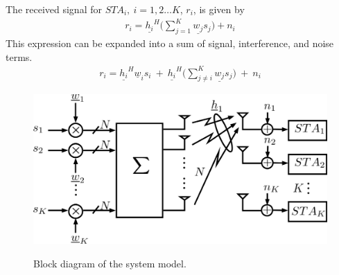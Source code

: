 The received signal for $STA_i,\ i=1,2\ldots K$, $r_i$, is given by
 \begin{equation}
     \begin{aligned}\label{eq:rx_sig}
        r_i = \underline{h_i}^H \big( \sum_{j=1}^K \underline{w_j}s_j \big) + n_i
     \end{aligned}
 \end{equation}
 This expression can be expanded into a sum of signal, interference, and noise terms.
  \begin{equation}
     \begin{aligned}\label{eq:rx_sig_expanded}
        r_i = \underline{h_i}^H \underline w_i s_i \ +\ \underline{h_i}^H\big( \sum_{j \neq i}^K \underline{w_j}s_j \big)\ +\ n_i
     \end{aligned}
 \end{equation}


\begin{figure}
    \includegraphics[width=14cm]{figs/system_desc.png}\\
    \caption{Block diagram of the system model.}
    \label{fig:sys_bd}
\end{figure}
